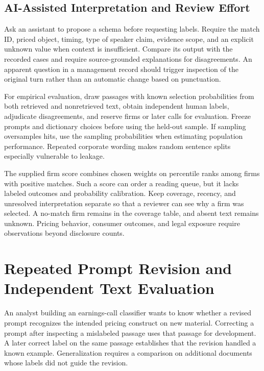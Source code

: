 \hypertarget{M05-ai-assisted-interpretation-and-review-effort}{%
\subsection{AI-Assisted Interpretation and Review
Effort}\label{M05-ai-assisted-interpretation-and-review-effort}}

\noindent \noindent Ask an assistant to propose a schema before requesting labels.
Require the match ID, priced object, timing, type of speaker claim,
evidence scope, and an explicit unknown value when context is
insufficient. Compare its output with the recorded cases and require
source-grounded explanations for disagreements. An apparent question in
a management record should trigger inspection of the original turn
rather than an automatic change based on punctuation.

For empirical evaluation, draw passages with known selection
probabilities from both retrieved and nonretrieved text, obtain
independent human labels, adjudicate disagreements, and reserve firms or
later calls for evaluation. Freeze prompts and dictionary choices before
using the held-out sample. If sampling oversamples hits, use the
sampling probabilities when estimating population performance. Repeated
corporate wording makes random sentence splits especially vulnerable to
leakage.

The supplied firm score combines chosen weights on percentile ranks
among firms with positive matches. Such a score can order a reading
queue, but it lacks labeled outcomes and probability calibration. Keep
coverage, recency, and unresolved interpretation separate so that a
reviewer can see why a firm was selected. A no-match firm remains in the
coverage table, and absent text remains unknown. Pricing behavior,
consumer outcomes, and legal exposure require observations beyond
disclosure counts.

\hypertarget{M05-repeated-prompt-revision-and-independent-text-evaluation}{%
\section{Repeated Prompt Revision and Independent Text
Evaluation}\label{M05-repeated-prompt-revision-and-independent-text-evaluation}}

\noindent \noindent An analyst building an earnings-call classifier wants to know
whether a revised prompt recognizes the intended pricing construct on
new material. Correcting a prompt after inspecting a mislabeled passage
uses that passage for development. A later correct label on the same
passage establishes that the revision handled a known example.
Generalization requires a comparison on additional documents whose
labels did not guide the revision.

